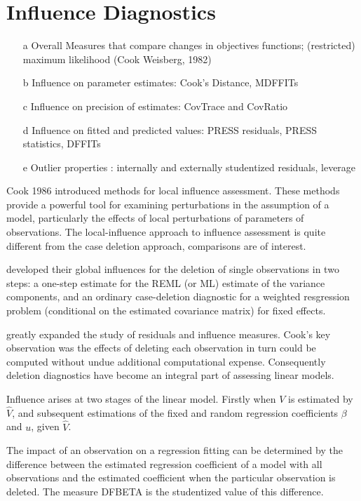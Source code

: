 \documentclass[12pt, a4paper]{report}
\theoremstyle{plain}
\theoremstyle{definition}
\theoremstyle{remark}
\begin{document}
	

\section{Influence Diagnostics}

\begin{itemize}
	\item[a] Overall Measures that compare changes in objectives functions; (restricted) maximum likelihood (Cook  Weisberg, 1982)
	\item[b] Influence on parameter estimates: Cook's Distance, MDFFITs
	\item[c] Influence on precision of estimates: CovTrace and CovRatio
	\item[d] Influence on fitted and predicted values: PRESS residuals, PRESS statistics, DFFITs
	\item[e] Outlier properties : internally and externally studentized residuals, leverage
\end{itemize}

Cook 1986 introduced methods for local influence assessment. These methods provide a powerful tool for examining perturbations in the assumption of a model, particularly the effects of local perturbations of parameters of observations. The local-influence approach to influence assessment is quite different from the case deletion approach, comparisons are of interest.

\citet{Christensen} developed their global influences for the deletion of single observations in two steps: a one-step estimate for the REML (or ML) estimate of the variance components, and an ordinary case-deletion diagnostic for a weighted resgression problem (conditional on the estimated covariance matrix) for fixed effects.

\citet{cook77} greatly expanded the study of residuals and influence measures. Cook's key observation was the effects of deleting each observation in turn could be computed without undue additional computational expense. Consequently deletion diagnostics have become an integral part of assessing linear models.

Influence arises at two stages of the linear model. Firstly when $V$ is estimated by $\hat{V}$, and subsequent
estimations of the fixed and random regression coefficients $\beta$ and $u$, given $\hat{V}$.

The impact of an observation on a regression fitting can be determined by the difference between the estimated regression coefficient of a model with all observations and the estimated coefficient when the particular observation is deleted. The measure DFBETA is the studentized value of this difference.
\end{document}
